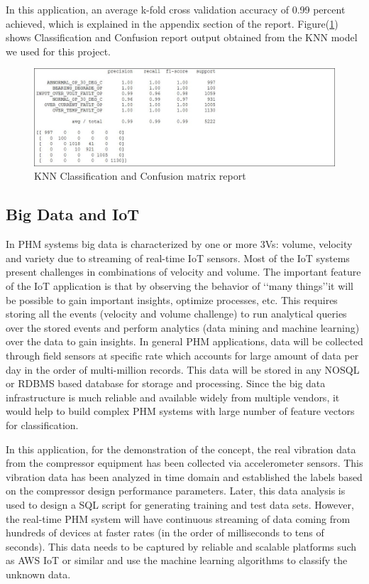 \documentclass[sigconf]{acmart}
\begin{document}
In this application, an average k-fold cross validation accuracy of 0.99 percent achieved, which is explained in the appendix section of the report. Figure(\ref{fig:Figure8}) shows Classification and Confusion report output obtained from the KNN model we used for this project.

\begin{figure}
\includegraphics[width=1.0\columnwidth]{images/knnclassification}
\caption{KNN Classification and Confusion matrix report} \label{fig:Figure8}
\end{figure}

\subsection{Big Data and IoT}
In PHM systems big data is characterized by one or more 3Vs: volume, velocity and variety due to streaming of real-time IoT sensors. Most of the IoT systems present challenges in combinations of velocity and volume. The important feature of the IoT application is that by observing the behavior of \lq\lq many things\rq\rq it will be possible to gain important insights, optimize processes, etc. This requires storing all the events (velocity and volume challenge) to run analytical queries over the stored events and perform analytics (data mining and machine learning) over the data to gain insights.
In general PHM applications, data will be collected through field sensors at specific rate which accounts for large amount of data per day in the order of multi-million records. This data will be stored in any NOSQL or RDBMS based database for storage and processing. Since the big data infrastructure is much reliable and available widely from multiple vendors, it would help to build complex PHM systems with large number of feature vectors for classification. 

In this application, for the demonstration of the concept, the real vibration data from the compressor equipment has been collected via accelerometer sensors. This vibration data has been analyzed in time domain and established the labels based on the compressor design performance parameters. Later, this data analysis is used to design a SQL script for generating training and test data sets. However, the real-time PHM system will have continuous streaming of data coming from hundreds of devices at faster rates (in the order of milliseconds to tens of seconds). This data needs to be captured by reliable and scalable platforms such as AWS IoT or similar and use the machine learning algorithms to classify the unknown data.
\end{document}
